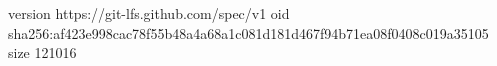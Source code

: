 version https://git-lfs.github.com/spec/v1
oid sha256:af423e998cac78f55b48a4a68a1c081d181d467f94b71ea08f0408c019a35105
size 121016
